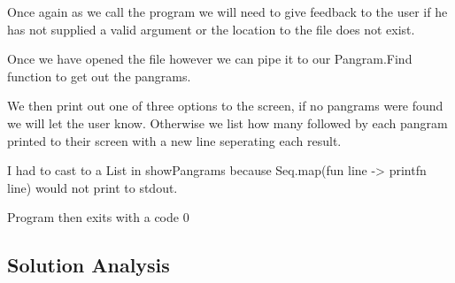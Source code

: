 Once again as we call the program we will need to give feedback to the user if he has not supplied a valid argument or the location to the file
does not exist.

Once we have opened the file however we can pipe it to our Pangram.Find function to get out the pangrams.

We then print out one of three options to the screen, if no pangrams were found we will let the user know. Otherwise we list how many followed by
each pangram printed to their screen with a new line seperating each result.

I had to cast to a List in showPangrams because Seq.map(fun line -> printfn line) would not print to stdout.

Program then exits with a code 0

\subsection{Solution Analysis}
